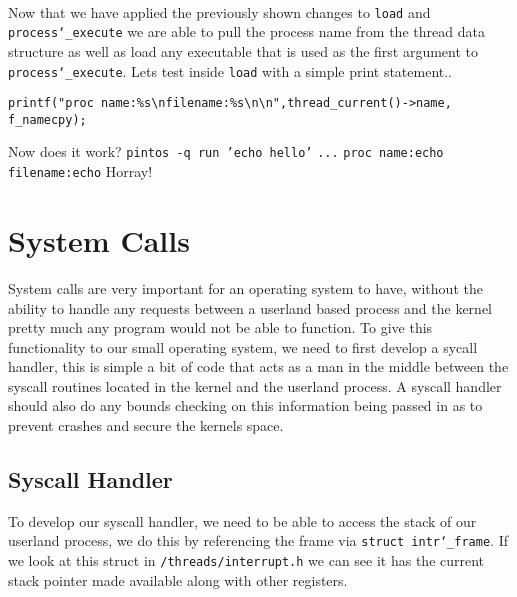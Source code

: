\documentclass[]{article}
\begin{document}
	\paragraph{}
	Now that we have applied the previously shown changes to \texttt{load} and \texttt{process\char`_execute} we are able to pull the process name from the thread data structure as well as load any executable that is used as the first argument to \texttt{process\char`_execute}.
	\newline
	\newline
	Lets test inside \texttt{load} with a simple print statement..
	\newline
    \lstset{language=C, tabsize=2}    
    \begin{lstlisting}
printf("proc name:%s\nfilename:%s\n\n",thread_current()->name, f_namecpy);
    \end{lstlisting}
    \texttt{}
    \newline
    Now does it work?
    \newline
    \newline
    \texttt{pintos -q run 'echo hello'}
    \newline
    \texttt{...}
    \newline
    \texttt{proc name:echo}
	\newline
	\texttt{filename:echo}
	\newline
	\newline
	Horray!

  \newpage
  \section{System Calls}
  System calls are very important for an operating system to have, without the ability to handle any requests between a userland based process and the kernel pretty much any program would not be able to function. To give this functionality to our small operating system, we need to first develop a sycall handler, this is simple a bit of code that acts as a man in the middle between the syscall routines located in the kernel and the userland process. A syscall handler should also do any bounds checking on this information being passed in as to prevent crashes and secure the kernels space.
  \subsection{Syscall Handler}
  
  To develop our syscall handler, we need to be able to access the stack of our userland process, we do this by referencing the frame via \texttt{struct intr\char`_frame}. If we look at this struct in \texttt{/threads/interrupt.h} we can see it has the current stack pointer made available along with other registers.
  
\end{document}
